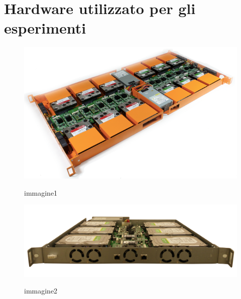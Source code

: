 \item
\section{Hardware utilizzato per gli esperimenti}

\begin{figure}[htbp]
\centering
\includegraphics[scale=0.40]{img/CY7x2.png}\\
\caption{immagine1 \label{figura1.10} \cite{etichetta9}}
\end{figure}

\begin{figure}[htbp]
\centering
\includegraphics[scale=0.40]{img/CY7.png}\\
\caption{immagine2 \label{figura1.11} \cite{etichetta9}}
\end{figure}

